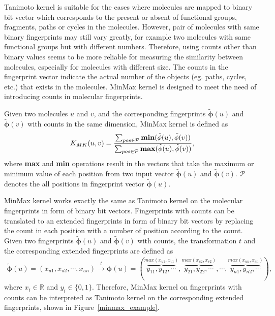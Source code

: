 \documentclass[english]{tktltiki}
\newcommand{\Pcal}{\mathcal{P}} %
\newcommand{\vphi}{\mathbf{\phi}}
\begin{document}

Tanimoto kernel is suitable for the cases where molecules are mapped to binary bit vector which corresponds to the present or absent of functional groups, fragments, paths or cycles in the molecules. However, pair of molecules with same binary fingerprints may still vary greatly, for example two molecules with same functional groups but with different numbers. Therefore, using counts other than binary values seems to be more reliable for measuring the similarity between molecules, especially for molecules with different size. The counts in the fingerprint vector indicate the actual number of the objects (eg. paths, cycles, etc.) that exists in the molecules. MinMax kernel \cite{ralaivola05} is designed to meet the need of introducing counts in molecular fingerprints.

Given two molecules $u$ and $v$, and the corresponding fingerprints $\tilde{\vphi}{(u)}$ and $\tilde{\vphi}{(v)}$ with counts in the same dimension, MinMax kernel is defined as
\begin{align*}
K_{MK}(u,v) = 
\displaystyle\frac{\sum_{pos \in \Pcal}{{\bf min}(\tilde{\vphi}{(u)},\tilde{\vphi}{(v)})}}{\sum_{pos \in \Pcal}{{\bf max}(\tilde{\vphi}{(u)},\tilde{\vphi}{(v)})}},
\end{align*}
where {\bf max} and {\bf min} operations result in the vectors that take the maximum or minimum value of each position from two input vector $\tilde{\vphi}{(u)}$ and $\tilde{\vphi}{(v)}$. $\Pcal$ denotes the all positions in fingerprint vector $\tilde{\vphi}{(u)}$.

MinMax kernel works exactly the same as Tanimoto kernel on the molecular fingerprints in form of binary bit vectors. Fingerprints with counts can be translated to an extended fingerprints in form of binary bit vectors by replacing the count in each position with a number of position according to the count. Given two fingerprints $\tilde{\vphi}{(u)}$ and $\tilde{\vphi}{(v)}$ with counts, the transformation $t$ and the corresponding extended fingerprints are defined as
\begin{align}
\tilde{\vphi}{(u)} = (x_{u1},x_{u2},\cdots,x_{un}) \xrightarrow{t} \vphi{(u)} = (\overbrace{y_{11},y_{12},\cdots}^{max(x_{u1},x_{v1})},\overbrace{y_{21},y_{22},\cdots}^{max(x_{u2},x_{v2})},\cdots,\overbrace{y_{n1},y_{n2},\cdots}^{max(x_{un},x_{vn})}),
\label{minmax_transform}
\end{align}
where $x_i \in \mathbb{R}$ and $y_i \in \{0,1\}$. Therefore, MinMax kernel on fingerprints with counts can be interpreted as Tanimoto kernel on the corresponding extended fingerprints, shown in Figure~\ref{minmax_example}. 
\end{document}
